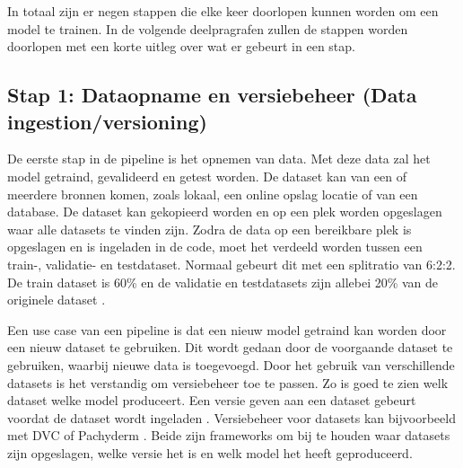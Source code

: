 In totaal zijn er negen stappen die elke keer doorlopen kunnen worden om een model te trainen. In de volgende deelpragrafen zullen de stappen worden doorlopen met een korte uitleg over wat er gebeurt in een stap. 

\subsection{Stap 1: Dataopname en versiebeheer (Data ingestion/versioning)}\label{subsec:ch4-data-opname-en-versiebeheer}
De eerste stap in de pipeline is het opnemen van data. Met deze data zal het model getraind, gevalideerd en getest worden. De dataset kan van een of meerdere bronnen komen, zoals lokaal, een online opslag locatie of van een database. De dataset kan gekopieerd worden en op een plek worden opgeslagen waar alle datasets te vinden zijn. Zodra de data op een bereikbare plek is opgeslagen en is ingeladen in de code, moet het verdeeld worden tussen een train-, validatie- en testdataset. Normaal gebeurt dit met een splitratio van 6:2:2. De train dataset is 60\% en de validatie en testdatasets zijn allebei 20\% van de originele dataset \cite[p.~27-37]{building-machine-learning-pipelines-oreilly}.

Een use case van een pipeline is dat een nieuw model getraind kan worden door een nieuw dataset te gebruiken. Dit wordt gedaan door de voorgaande dataset te gebruiken, waarbij nieuwe data is toegevoegd. Door het gebruik van verschillende datasets is het verstandig om versiebeheer toe te passen. Zo is goed te zien welk dataset welke model produceert. Een versie geven aan een dataset gebeurt voordat de dataset wordt ingeladen \cite[p.~39-40]{building-machine-learning-pipelines-oreilly}. Versiebeheer voor datasets kan bijvoorbeeld met DVC \cite{dvc} of Pachyderm \cite{pachyderm}. Beide zijn frameworks om bij te houden waar datasets zijn opgeslagen, welke versie het is en welk model het heeft geproduceerd.



